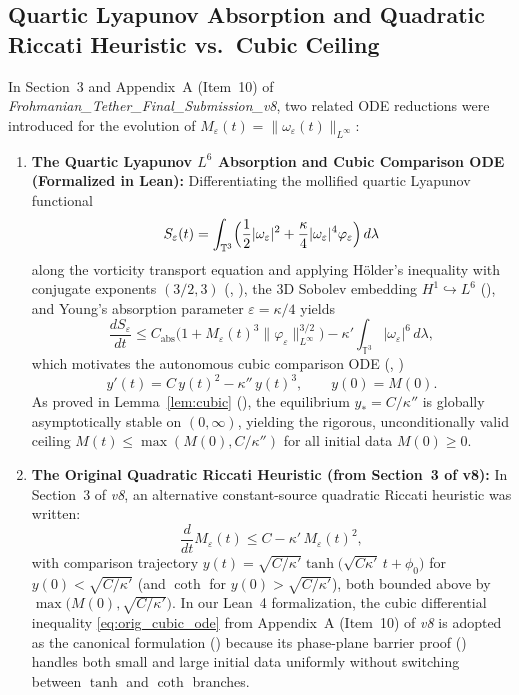 \documentclass[11pt,a4paper]{article}
\theoremstyle{plain}
\theoremstyle{definition}
\theoremstyle{remark}
\newcommand{\T}{\mathbb{T}^3}
\begin{document}
\subsection{Quartic Lyapunov Absorption and Quadratic Riccati Heuristic vs.\ Cubic Ceiling}
In Section~3 and Appendix~A (Item~10) of \emph{Frohmanian\_Tether\_Final\_Submission\_v8}, two related ODE reductions were introduced for the evolution of $M_\varepsilon(t)=\|\omega_\varepsilon(t)\|_{L^\infty}$:
\begin{enumerate}
\item \textbf{The Quartic Lyapunov $L^6$ Absorption and Cubic Comparison ODE (Formalized in Lean):}
Differentiating the mollified quartic Lyapunov functional
\[
S_\varepsilon(t)=\int_{\T}\Bigl(\frac12|\omega_\varepsilon|^2+\frac{\kappa}{4}|\omega_\varepsilon|^4\varphi_\varepsilon\Bigr)\,d\lambda
\]
along the vorticity transport equation and applying Hölder's inequality with conjugate exponents $(3/2,3)$ (, ), the 3D Sobolev embedding $H^1\hookrightarrow L^6$ (), and Young's absorption parameter $\varepsilon=\kappa/4$ yields
\begin{equation}\label{eq:orig_dS}
\frac{dS_\varepsilon}{dt}\le C_{\mathrm{abs}}\bigl(1+M_\varepsilon(t)^3\|\varphi_\varepsilon\|_{L^\infty}^{3/2}\bigr)-\kappa'\int_{\T}|\omega_\varepsilon|^6\,d\lambda,
\end{equation}
which motivates the autonomous cubic comparison ODE (, )
\begin{equation}\label{eq:orig_cubic_ode}
y'(t) = C\,y(t)^2 - \kappa''\,y(t)^3,\qquad y(0)=M(0).
\end{equation}
As proved in Lemma~\ref{lem:cubic} (), the equilibrium $y_*=C/\kappa''$ is globally asymptotically stable on $(0,\infty)$, yielding the rigorous, unconditionally valid ceiling $M(t)\le\max(M(0),C/\kappa'')$ for all initial data $M(0)\ge0$.
\item \textbf{The Original Quadratic Riccati Heuristic (from Section~3 of v8):}
In Section~3 of \emph{v8}, an alternative constant-source quadratic Riccati heuristic was written:
\begin{equation}\label{eq:orig_quad_riccati}
\frac{d}{dt}M_\varepsilon(t) \le C - \kappa'\,M_\varepsilon(t)^2,
\end{equation}
with comparison trajectory $y(t)=\sqrt{C/\kappa'}\tanh\bigl(\sqrt{C\kappa'}\,t+\phi_0\bigr)$ for $y(0)<\sqrt{C/\kappa'}$ (and $\coth$ for $y(0)>\sqrt{C/\kappa'}$), both bounded above by $\max\bigl(M(0),\sqrt{C/\kappa'}\bigr)$. In our Lean~4 formalization, the cubic differential inequality \eqref{eq:orig_cubic_ode} from Appendix~A (Item~10) of \emph{v8} is adopted as the canonical formulation () because its phase-plane barrier proof () handles both small and large initial data uniformly without switching between $\tanh$ and $\coth$ branches.
\end{enumerate}
\end{document}
